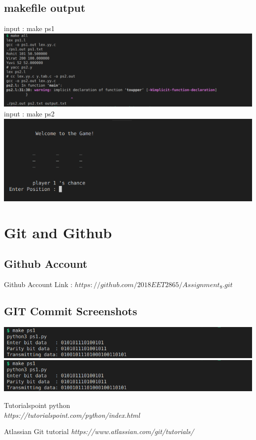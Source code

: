 \documentclass{article}
\begin{document}
    \subsection{makefile output}
    input : make ps1\\
    \includegraphics[width=1.2\textwidth]{./images/mk_001.png}
    input : make ps2\\
    \includegraphics[width=1.2\textwidth]{./images/mk_002.png}

    \newpage

    \section{Git and Github}
    \subsection{Github Account}
    Github Account Link : $https://github.com/2018EET2865/Assignment_8.git$
    \subsection{GIT Commit Screenshots}
    \includegraphics[width=1.2\textwidth]{./images/gt_001.png}
    \includegraphics[width=1.2\textwidth]{./images/gt_001.png}

    \newpage
	\begin{thebibliography}{9}
        Tutorialspoint python\\
        \textit{https://tutorialspoint.com/python/index.html}
         
        Atlassian Git tutorial 
        \textit{https://www.atlassian.com/git/tutorials/} 
    \end{thebibliography}
    
\end{document}
